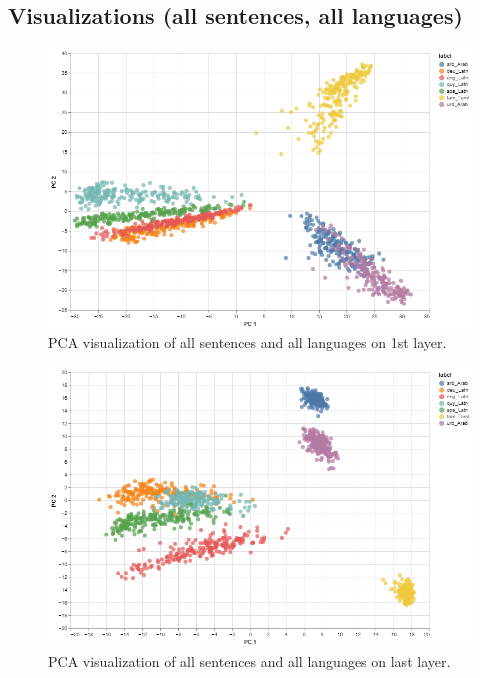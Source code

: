 \documentclass[11pt]{article}
\begin{document}
\subsection{Visualizations (all sentences, all languages)}


\begin{figure}[ht]
\centering
\includegraphics[width=0.9\columnwidth]{allSentenceLang_firstLayer_pca.png}
\caption{PCA visualization of all sentences and all languages on 1st layer.}
\end{figure}


\begin{figure}[ht]
\centering
\includegraphics[width=0.9\columnwidth]{allSentenceLang_lastLayer_pca.png}
\caption{PCA visualization of all sentences and all languages on last layer.}
\end{figure}
\end{document}
